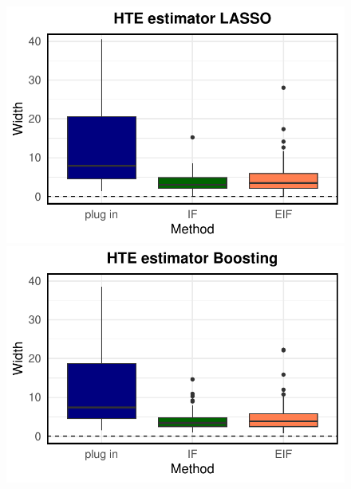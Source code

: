 \begin{figure}[ht]
        \begin{minipage}{0.3\textwidth}
                \centering
                \includegraphics[clip, trim = 0cm 0cm 0cm 0cm, width = \textwidth]{plot/ACIC_nonlinear_propensity_linear_HTE_CI_width_LASSO.pdf}
        \end{minipage}
        \begin{minipage}{0.3\textwidth}
                \centering
                \includegraphics[clip, trim = 0cm 0cm 0cm 0cm, width = \textwidth]{plot/ACIC_nonlinear_propensity_linear_HTE_CI_width_Boosting.pdf}
        \end{minipage}
        \begin{minipage}{0.3\textwidth}
                \centering

\end{minipage}
\end{figure}
